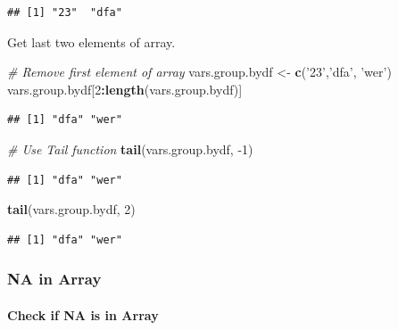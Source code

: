 \documentclass[
]{book}
\newenvironment{Shaded}{\begin{snugshade}}{\end{snugshade}}
\newcommand{\CommentTok}[1]{\textcolor[rgb]{0.56,0.35,0.01}{\textit{#1}}}
\newcommand{\DecValTok}[1]{\textcolor[rgb]{0.00,0.00,0.81}{#1}}
\newcommand{\KeywordTok}[1]{\textcolor[rgb]{0.13,0.29,0.53}{\textbf{#1}}}
\newcommand{\NormalTok}[1]{#1}
\newcommand{\OperatorTok}[1]{\textcolor[rgb]{0.81,0.36,0.00}{\textbf{#1}}}
\newcommand{\StringTok}[1]{\textcolor[rgb]{0.31,0.60,0.02}{#1}}
\begin{document}
\begin{verbatim}
## [1] "23"  "dfa"
\end{verbatim}

Get last two elements of array.

\begin{Shaded}
\begin{Highlighting}[]
\CommentTok{# Remove first element of array}
\NormalTok{vars.group.bydf <-}\StringTok{ }\KeywordTok{c}\NormalTok{(}\StringTok{'23'}\NormalTok{,}\StringTok{'dfa'}\NormalTok{, }\StringTok{'wer'}\NormalTok{)}
\NormalTok{vars.group.bydf[}\DecValTok{2}\OperatorTok{:}\KeywordTok{length}\NormalTok{(vars.group.bydf)]}
\end{Highlighting}
\end{Shaded}

\begin{verbatim}
## [1] "dfa" "wer"
\end{verbatim}

\begin{Shaded}
\begin{Highlighting}[]
\CommentTok{# Use Tail function}
\KeywordTok{tail}\NormalTok{(vars.group.bydf, }\DecValTok{-1}\NormalTok{)}
\end{Highlighting}
\end{Shaded}

\begin{verbatim}
## [1] "dfa" "wer"
\end{verbatim}

\begin{Shaded}
\begin{Highlighting}[]
\KeywordTok{tail}\NormalTok{(vars.group.bydf, }\DecValTok{2}\NormalTok{)}
\end{Highlighting}
\end{Shaded}

\begin{verbatim}
## [1] "dfa" "wer"
\end{verbatim}

\hypertarget{na-in-array}{%
\subsubsection{NA in Array}\label{na-in-array}}

\hypertarget{check-if-na-is-in-array}{%
\paragraph{Check if NA is in Array}\label{check-if-na-is-in-array}}
\end{document}
